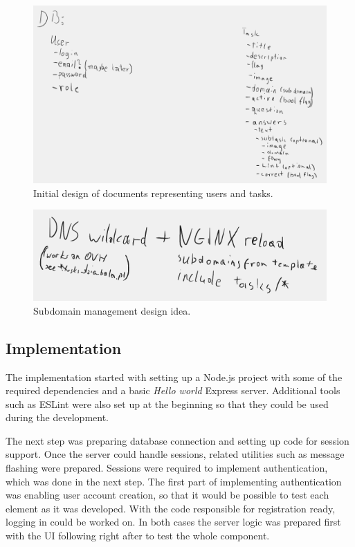 \begin{figure}
	\centering
	\includegraphics[width=\textwidth]{img/init-db-struct.png}
	\caption{Initial design of documents representing users and tasks.}
	\label{fig:init-db-struct}
\end{figure}

\begin{figure}
	\centering
	\includegraphics[width=\textwidth]{img/subdomain-idea.png}
	\caption{Subdomain management design idea.}
	\label{fig:subdomain-idea}
\end{figure}

\subsection{Implementation}

The implementation started with setting up a Node.js project with some of the required dependencies and a basic \textit{Hello world} Express server. Additional tools such as ESLint were also set up at the beginning so that they could be used during the development.

The next step was preparing database connection and setting up code for session support. Once the server could handle sessions, related utilities such as message flashing were prepared. Sessions were required to implement authentication, which was done in the next step. The first part of implementing authentication was enabling user account creation, so that it would be possible to test each element as it was developed. With the code responsible for registration ready, logging in could be worked on. In both cases the server logic was prepared first with the UI following right after to test the whole component.

